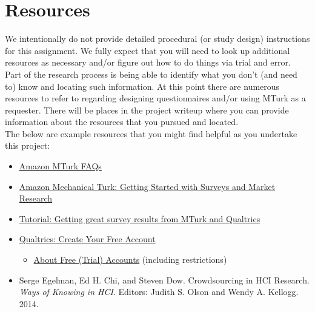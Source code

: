 \documentclass{article}
\begin{document}
\section{Resources}
We intentionally do not provide detailed procedural (or study design) instructions for this assignment. We fully expect that you will need to look up additional resources as necessary and/or figure out how to do things via trial and error.\\ 

Part of the research process is being able to identify what you don't (and need to) know and locating such information. At this point there are numerous resources to refer to regarding designing questionnaires and/or using MTurk as a requester. There will be places in the project writeup where you can provide information about the resources that you pursued and located.\\

The below are example resources that you might find helpful as you undertake this project:
\begin{itemize}
    \item \href{https://www.mturk.com/help}{Amazon MTurk FAQs}
    \item \href{https://medium.com/@mechanicalturk/getting-started-with-surveys-and-market-research-3ca5c3b34f5b}{Amazon Mechanical Turk: Getting Started with Surveys and Market Research}
    \item \href{https://blog.mturk.com/tutorial-getting-great-survey-results-from-mturk-and-qualtrics-f5366f0bd880}{Tutorial: Getting great survey results from MTurk and Qualtrics}
    \item \href{https://www.qualtrics.com/free-account/}{Qualtrics: Create Your Free Account}
        \begin{itemize}
            \item \href{https://www.qualtrics.com/support/survey-platform/managing-your-account/trial-accounts/}{About Free (Trial) Accounts} (including restrictions)
        \end{itemize}
        \item Serge Egelman, Ed H. Chi, and Steven Dow. Crowdsourcing in HCI Research. \textit{Ways of Knowing in HCI}. Editors: Judith S. Olson and Wendy A. Kellogg. 2014. 
\end{itemize}
\end{document}
